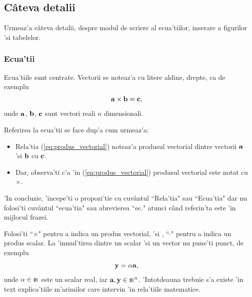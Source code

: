 \subsection{C\^ateva detalii}
\label{sec:detalii} 
Urmeaz'a c\^ateva detalii, despre modul de scriere al ecua'tiilor, inserare a figurilor 'si tabelelor.

\subsubsection{Ecua'tii}
Ecua'tiile sunt centrate. Vectorii se noteaz'a cu litere aldine, drepte, ca de exemplu
\begin{equation}
\label{eq:produs_vectorial}
\vect{a}\times\vect{b}=\vect{c},          %
\end{equation}
unde $\mathbf{a}$, $\mathbf{b}$, $\mathbf{c}$ sunt vectori reali $n$ dimensionali.

Referirea la ecua'tii se face dup'a cum urmeaz'a:
\begin{itemize}
\item Rela'tia (\ref{eq:produs_vectorial}) noteaz'a produsul vectorial dintre vectorii $\mathbf{a}$ 'si $\mathbf{b}$ cu $\mathbf{c}$.
\item Dar, observa'ti c'a 'in (\ref{eq:produs_vectorial}) produsul vectorial este notat cu $\times$.
\end{itemize}
'In concluzie, 'incepe'ti o propozi'tie cu cuv\^antul ``Rela'tia" sau  ``Ecua'tia" dar  nu folosi'ti cuv\^antul ``ecua'tia"
sau abrevierea  ``ec." atunci c\^and referin'ta este 'in mijlocul frazei.

Folosi'ti ``$\times$"  pentru a indica un produs vectorial, 'si ,
``$\cdot$" pentru a indica un produs scalar. La 'inmul'tirea dintre un scalar 'si un vector nu pune'ti punct, de exemplu
\begin{equation}
\label{eq:produs_scalar_vector}
\vect{y} = \alpha \vect{a},           %
\end{equation}
unde $\alpha \in \mbox{${\scriptstyle \rm I\!R}$}$ este un scalar real, iar $\mathbf{a}, \mathbf{y} \in \mbox{${\scriptstyle \rm I\!R}$}^n$. 'Intotdeauna trebuie s'a existe 'in text explica'tiile m'arimilor care intervin 'in rela'tiile matematice.

